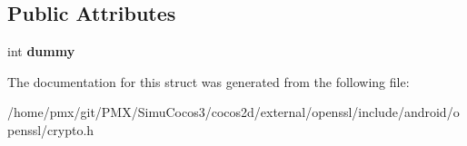\subsection*{Public Attributes}
\begin{DoxyCompactItemize}
\item 
\mbox{\label{structcrypto__ex__data__st_a1aa7e9db2ba85dfdcde7d21eb9c6897d}} 
int {\bfseries dummy}
\end{DoxyCompactItemize}


The documentation for this struct was generated from the following file\+:\begin{DoxyCompactItemize}
\item 
/home/pmx/git/\+P\+M\+X/\+Simu\+Cocos3/cocos2d/external/openssl/include/android/openssl/crypto.\+h\end{DoxyCompactItemize}
